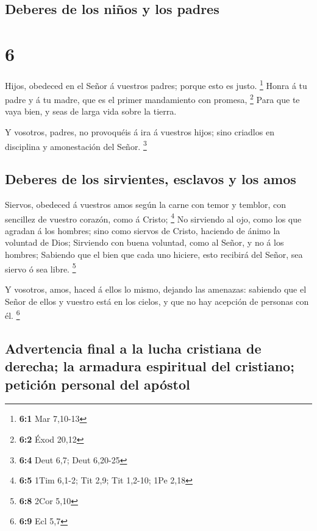 \hypertarget{deberes-de-los-niuxf1os-y-los-padres}{%
\subsection{Deberes de los niños y los
padres}\label{deberes-de-los-niuxf1os-y-los-padres}}

\hypertarget{section-5}{%
\section{6}\label{section-5}}

 Hijos, obedeced en el Señor á vuestros padres; porque
esto es justo. \footnote{\textbf{6:1} Mar 7,10-13}  Honra
á tu padre y á tu madre, que es el primer mandamiento con promesa,
\footnote{\textbf{6:2} Éxod 20,12}  Para que te vaya bien,
y seas de larga vida sobre la tierra.

 Y vosotros, padres, no provoquéis á ira á vuestros hijos;
sino criadlos en disciplina y amonestación del Señor. \footnote{\textbf{6:4}
  Deut 6,7; Deut 6,20-25}

\hypertarget{deberes-de-los-sirvientes-esclavos-y-los-amos}{%
\subsection{Deberes de los sirvientes, esclavos y los
amos}\label{deberes-de-los-sirvientes-esclavos-y-los-amos}}

 Siervos, obedeced á vuestros amos según la carne con
temor y temblor, con sencillez de vuestro corazón, como á Cristo;
\footnote{\textbf{6:5} 1Tim 6,1-2; Tit 2,9; Tit 1,2-10; 1Pe 2,18}
 No sirviendo al ojo, como los que agradan á los hombres;
sino como siervos de Cristo, haciendo de ánimo la voluntad de Dios;
 Sirviendo con buena voluntad, como al Señor, y no á los
hombres;  Sabiendo que el bien que cada uno hiciere, esto
recibirá del Señor, sea siervo ó sea libre. \footnote{\textbf{6:8} 2Cor
  5,10}

 Y vosotros, amos, haced á ellos lo mismo, dejando las
amenazas: sabiendo que el Señor de ellos y vuestro está en los cielos, y
que no hay acepción de personas con él. \footnote{\textbf{6:9} Ecl 5,7}

\hypertarget{advertencia-final-a-la-lucha-cristiana-de-derecha-la-armadura-espiritual-del-cristiano-peticiuxf3n-personal-del-apuxf3stol}{%
\subsection{Advertencia final a la lucha cristiana de derecha; la
armadura espiritual del cristiano; petición personal del
apóstol}\label{advertencia-final-a-la-lucha-cristiana-de-derecha-la-armadura-espiritual-del-cristiano-peticiuxf3n-personal-del-apuxf3stol}}


